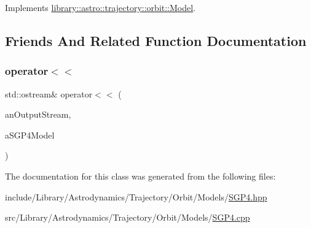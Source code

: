 Implements \hyperlink{classlibrary_1_1astro_1_1trajectory_1_1orbit_1_1_model_abd4fb7604274cc8b3589a445db64e98c}{library\+::astro\+::trajectory\+::orbit\+::\+Model}.



\subsection{Friends And Related Function Documentation}
\mbox{\label{classlibrary_1_1astro_1_1trajectory_1_1orbit_1_1models_1_1_s_g_p4_a44bd6a41f5d1be384d07b897785529f1}} 
\subsubsection{\texorpdfstring{operator$<$$<$}{operator<<}}
{\footnotesize\ttfamily std\+::ostream\& operator$<$$<$ (\begin{DoxyParamCaption}\item[{std\+::ostream \&}]{an\+Output\+Stream,  }\item[{const \hyperlink{classlibrary_1_1astro_1_1trajectory_1_1orbit_1_1models_1_1_s_g_p4}{S\+G\+P4} \&}]{a\+S\+G\+P4\+Model }\end{DoxyParamCaption})\hspace{0.3cm}{\ttfamily [friend]}}



The documentation for this class was generated from the following files\+:\begin{DoxyCompactItemize}
\item 
include/\+Library/\+Astrodynamics/\+Trajectory/\+Orbit/\+Models/\hyperlink{_s_g_p4_8hpp}{S\+G\+P4.\+hpp}\item 
src/\+Library/\+Astrodynamics/\+Trajectory/\+Orbit/\+Models/\hyperlink{_s_g_p4_8cpp}{S\+G\+P4.\+cpp}\end{DoxyCompactItemize}
